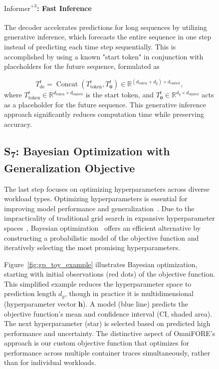 \begin{figure}[!htbp]
{\paragraph*{$\text{Informer}^{+3}$: Fast Inference}

The decoder accelerates predictions for long sequences by utilizing generative inference, which forecasts the entire sequence in one step instead of predicting each time step sequentially. This is accomplished by using a known "start token" in conjunction with placeholders for the future sequence, formulated as

\begin{equation}
T_{\mathrm{de}}^{t} = \operatorname{Concat}\left(T_{\text{token}}^{t}, T_{\mathbf{0}}^{t}\right) \in \mathbb{R}^{(d_{\text{token}} + d_y) \times d_{\text{embed}}},
\end{equation}
where $T_{\text{token}}^{t} \in \mathbb{R}^{d_{\text{token}} \times d_{\text{embed}}}$ is the start token, and $T_{\mathbf{0}}^{t} \in \mathbb{R}^{d_y \times d_{\text{embed}}}$ acts as a placeholder for the future sequence. This generative inference approach significantly reduces computation time while preserving accuracy.



\subsection{\texorpdfstring{S\textsubscript{7}: Bayesian Optimization with Generalization Objective}{S7: Bayesian Optimization with Generalization Objective}}
\label{sec:ch4_bayesian_optimization}

The last step focuses on optimizing hyperparameters across diverse workload types. Optimizing hyperparameters is essential for improving model performance and generalization~\cite{hyperparamsdatasets}. Due to the impracticality of traditional grid search in expansive hyperparameter spaces~\cite{gridsearchvsbayesian}, Bayesian optimization~\cite{frazier2018tutorial} offers an efficient alternative by constructing a probabilistic model of the objective function and iteratively selecting the most promising hyperparameters.

Figure~\ref{fig:gp_toy_example} illustrates Bayesian optimization, starting with initial observations (red dots) of the objective function. This simplified example reduces the hyperparameter space to prediction length $d_y$, though in practice it is multidimensional (hyperparameter vector $\mathbf{h}$). A model (blue line) predicts the objective function's mean and confidence interval (CI, shaded area). The next hyperparameter (star) is selected based on predicted high performance and uncertainty. The distinctive aspect of \ac{OmniFORE}'s approach is our custom objective function that optimizes for performance across multiple container traces simultaneously, rather than for individual workloads.

}
\end{figure}
